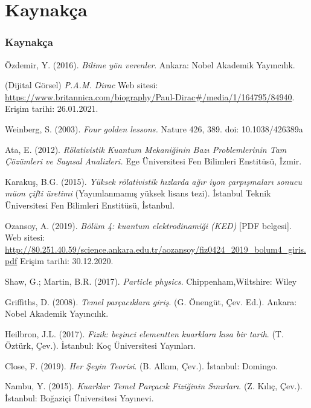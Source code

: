 \documentclass[aspectratio=169,10pt]{beamer}
\begin{document}
\section{Kaynakça}
\begin{frame}[allowframebreaks]
\frametitle{Kaynakça}

	\begin{thebibliography}{99}
	
	  Özdemir, Y. (2016).  \textit{Bilime yön verenler}. Ankara: Nobel Akademik Yayıncılık.
	
	  (Dijital Görsel) \textit{P.A.M. Dirac} Web sitesi: \url{https://www.britannica.com/biography/Paul-Dirac#/media/1/164795/84940}. Erişim tarihi: 26.01.2021.
	
	 Weinberg, S. (2003). \textit{Four golden lessons.} Nature 426, 389. doi: 10.1038/426389a
	
	 Ata, E. (2012). \textit{Rölativistik Kuantum Mekaniğinin Bazı Problemlerinin Tam Çözümleri ve Sayısal Analizleri.} Ege Üniversitesi Fen Bilimleri Enstitüsü, İzmir.
	
	 Karakuş, B.G. (2015). \textit{Yüksek rölativistik hızlarda ağır iyon çarpışmaları sonucu müon çifti üretimi} (Yayımlanmamış yüksek lisans tezi). İstanbul Teknik Üniversitesi Fen Bilimleri Enstitüsü, İstanbul.
	
	 Ozansoy, A. (2019). \textit{Bölüm 4: kuantum elektrodinamiği (KED)} [PDF  belgesi]. Web sitesi: \url{http://80.251.40.59/science.ankara.edu.tr/aozansoy/fiz0424_2019_bolum4_giris.pdf} Erişim tarihi: 30.12.2020.
	
	 Shaw, G.; Martin, B.R. (2017). \textit{Particle physics}. Chippenham,Wiltshire: Wiley
	
	 Griffiths, D. (2008). \textit{Temel parçacıklara giriş}. (G. Önengüt, Çev. Ed.). Ankara: Nobel Akademik Yayıncılık.


	 Heilbron, J.L. (2017). \textit{Fizik: beşinci elementten kuarklara kısa bir tarih}. (T. Öztürk, Çev.). İstanbul: Koç Üniversitesi Yayınları.
	
	 Close, F. (2019). \textit{Her Şeyin Teorisi}. (B. Alkım, Çev.). İstanbul: Domingo.
	
	 Nambu, Y. (2015). \textit{Kuarklar Temel Parçacık Fiziğinin Sınırları}. (Z. Kılıç, Çev.). İstanbul: Boğaziçi Üniversitesi Yayınevi.
	
	
	
	
	\end{thebibliography}
\end{frame}
\end{document}
